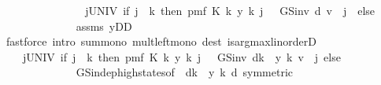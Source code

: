 \begin{isabellebody}
\ \ \ \ \ \ \ \ \ \ \isamarkupfalse%
\ \isamarkupfalse%
\ {\isachardoublequoteopen}{\isasymdots}\ {\isasymle}\ {\isacharparenleft}{\kern0pt}{\isasymSum}j{\isasymin}UNIV{\isachardot}{\kern0pt}\ {\isacharparenleft}{\kern0pt}if\ j\ {\isacharless}{\kern0pt}\ k\ then\ pmf\ {\isacharparenleft}{\kern0pt}K\ {\isacharparenleft}{\kern0pt}k{\isacharcomma}{\kern0pt}\ y\ k{\isacharparenright}{\kern0pt}{\isacharparenright}{\kern0pt}\ j\ \ {\isacharasterisk}{\kern0pt}\ GS{\isacharunderscore}{\kern0pt}inv\ d\ v\ {\isachardollar}{\kern0pt}\ j\ \ else\ {}{\isacharparenright}{\kern0pt}{\isacharparenright}{\kern0pt}{\isachardoublequoteclose}\isanewline
\ \ \ \ \ \ \ \ \ \ \ \ \isamarkupfalse%
\ assms\ {\isacartoucheopen}y{\isasymin}D\isactrlsub D{\isacartoucheclose}\isanewline
\ \ \ \ \ \ \ \ \ \ \ \ \isamarkupfalse%
\ {\isacharparenleft}{\kern0pt}fastforce\ intro{\isacharbang}{\kern0pt}{\isacharcolon}{\kern0pt}\ sum{\isacharunderscore}{\kern0pt}mono\ mult{\isacharunderscore}{\kern0pt}left{\isacharunderscore}{\kern0pt}mono\ dest{\isacharcolon}{\kern0pt}\ is{\isacharunderscore}{\kern0pt}arg{\isacharunderscore}{\kern0pt}max{\isacharunderscore}{\kern0pt}linorderD{\isacharparenright}{\kern0pt}\isanewline
\ \ \ \ \ \ \ \ \ \ \isamarkupfalse%
\ \isamarkupfalse%
\ {\isachardoublequoteopen}{\isasymdots}\ {\isacharequal}{\kern0pt}\ \ {\isacharparenleft}{\kern0pt}{\isasymSum}j{\isasymin}UNIV{\isachardot}{\kern0pt}\ {\isacharparenleft}{\kern0pt}if\ j\ {\isacharless}{\kern0pt}\ k\ then\ pmf\ {\isacharparenleft}{\kern0pt}K\ {\isacharparenleft}{\kern0pt}k{\isacharcomma}{\kern0pt}\ y\ k{\isacharparenright}{\kern0pt}{\isacharparenright}{\kern0pt}\ j\ \ {\isacharasterisk}{\kern0pt}\ GS{\isacharunderscore}{\kern0pt}inv\ {\isacharparenleft}{\kern0pt}d{\isacharparenleft}{\kern0pt}k\ {\isacharcolon}{\kern0pt}{\isacharequal}{\kern0pt}\ y\ k{\isacharparenright}{\kern0pt}{\isacharparenright}{\kern0pt}\ v\ {\isachardollar}{\kern0pt}\ j\ else\ {}{\isacharparenright}{\kern0pt}{\isacharparenright}{\kern0pt}{\isachardoublequoteclose}\ \ \isanewline
\ \ \ \ \ \ \ \ \ \ \ \ \isamarkupfalse%
\ GS{\isacharunderscore}{\kern0pt}indep{\isacharunderscore}{\kern0pt}high{\isacharunderscore}{\kern0pt}states{\isacharbrackleft}{\kern0pt}of\ {\isacharunderscore}{\kern0pt}\ {\isachardoublequoteopen}d{\isacharparenleft}{\kern0pt}k\ {\isacharcolon}{\kern0pt}{\isacharequal}{\kern0pt}\ y\ k{\isacharparenright}{\kern0pt}{\isachardoublequoteclose}\ d{\isacharcomma}{\kern0pt}\ symmetric{\isacharbrackright}{\kern0pt}\isanewline

\end{isabellebody}
